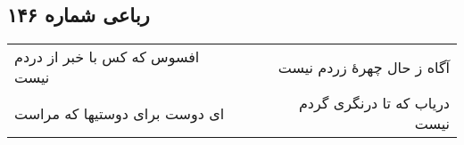 \begin{center}
\section*{رباعی شماره ۱۴۶}
\label{sec:sh146}
\begin{longtable}{l p{0.5cm} r}
افسوس که کس با خبر از دردم نیست
&&
آگاه ز حال چهرهٔ زردم نیست
\\
ای دوست برای دوستیها که مراست
&&
دریاب که تا درنگری گردم نیست
\\
\end{longtable}
\end{center}
